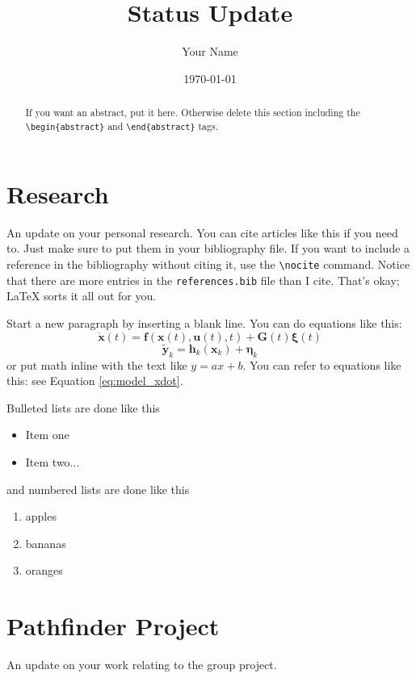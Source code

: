 \documentclass{article}
\title{Status Update}
\author{Your Name}
\date{\today} %
\newcommand{\vect}[1]{\ensuremath{\mathbf{#1}}}
\newcommand{\mat}[1]{\ensuremath{\mathbf{#1}}}
\newcommand{\of}[1]{\ensuremath{\left(#1\right)}}
\begin{document}
\maketitle

\begin{abstract}
If you want an abstract, put it here. Otherwise delete this section including the \verb|\begin{abstract}| and \verb|\end{abstract}| tags.
\end{abstract}

\section{Research}

An update on your personal research. You can cite articles like this \cite{leishman2014quadrotors} if you need to. Just make sure to put them in your bibliography file. If you want to include a reference in the bibliography without citing it, use the \verb|\nocite| command. \nocite{beard2012small} Notice that there are more entries in the \verb|references.bib| file than I cite. That's okay; \LaTeX{} sorts it all out for you.

Start a new paragraph by inserting a blank line. You can do equations like this:
\begin{equation}
\dot{\vect{x}}\of{t} = \vect{f}\of{\vect{x}\of{t},\vect{u}\of{t},t} + \mat{G}\of{t} \vect{\xi}\of{t}
\label{eq:model_xdot}
\end{equation}
\begin{equation}
\vect{\tilde{y}}_k = \vect{h}_k\of{\vect{x}_k} + \vect{\eta}_k
\label{eq:model_y}
\end{equation}
or put math inline with the text like $y = ax + b$. You can refer to equations like this: see Equation \eqref{eq:model_xdot}.

Bulleted lists are done like this
\begin{itemize}
\item Item one
\item Item two...
\end{itemize}
and numbered lists are done like this
\begin{enumerate}
\item apples
\item bananas
\item oranges
\end{enumerate}

\section{Pathfinder Project}

An update on your work relating to the group project.

\printbibliography
\end{document}

